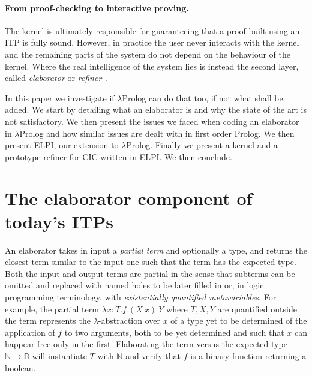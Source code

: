 \documentclass{easychair}
\begin{document}
\paragraph{From proof-checking to interactive proving.}

The kernel is ultimately responsible for guaranteeing that a proof
built using an ITP is fully sound. However, in practice the user never
interacts with the kernel and the remaining parts of the system do not
depend on the behaviour of the kernel. Where the real intelligence of
the system lies is instead the second layer, called \emph{elaborator}
or \emph{refiner}~\cite{??,??,??}.


In this paper we investigate if $\lambda$Prolog can do that too, if not
what shall be added.  We start by detailing what an elaborator is and
why the state of the art is not satisfactory.  We then present the
issues
we faced when coding an elaborator in $\lambda$Prolog and how similar issues are
dealt with in first order Prolog.  We then present ELPI, our extension to
$\lambda$Prolog.  Finally we present a kernel and a prototype refiner for CIC
written in ELPI.  We then conclude.

\section{The elaborator component of today's ITPs}

An elaborator takes in input a \emph{partial term} and optionally a
type, and returns the closest term similar to the input one such that
the term has the expected type. Both the input and output terms are
partial in the sense that subterms can be omitted and replaced with
named holes to be later filled in or, in logic programming
terminology, with \emph{existentially quantified metavariables}. For
example, the partial term $\lambda x: T. f~(X~x)~Y$ where $T,X,Y$ are
quantified outside the term represents the $\lambda$-abstraction over
$x$ of a type yet to be determined of the application of $f$ to two
arguments, both to be yet determined and such that $x$ can happear
free only in the first. Elaborating the term versus the expected type
$\mathbb{N} \to \mathbb{B}$ will instantiate $T$ with $\mathbb{N}$ and
verify that $f$ is a binary function returning a boolean.
\end{document}
